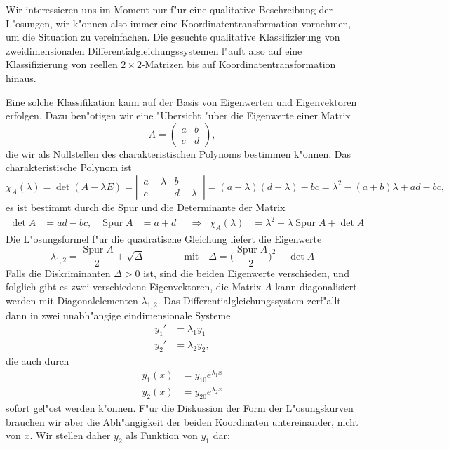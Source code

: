 Wir interessieren uns im Moment nur f"ur eine qualitative Beschreibung
der L"osungen, wir k"onnen also immer eine Koordinatentransformation
vornehmen, um die Situation zu vereinfachen.
Die gesuchte qualitative Klassifizierung von zweidimensionalen
Differentialgleichungssystemen l"auft also auf eine Klassifizierung
von reellen $2\times 2$-Matrizen bis auf Koordinatentransformation
hinaus.

Eine solche Klassifikation kann auf der Basis von Eigenwerten und
Eigenvektoren erfolgen.
Dazu ben"otigen wir eine "Ubersicht "uber die Eigenwerte einer
Matrix
\[
A=\begin{pmatrix}a&b\\c&d\end{pmatrix},
\]
die wir als Nullstellen des charakteristischen Polynoms bestimmen
k"onnen.
Das charakteristische Polynom ist
\[
\chi_A(\lambda)
=
\det(A-\lambda E)
=
\left|\,\begin{matrix}a-\lambda&b\\c&d-\lambda\end{matrix}\,\right|
=
(a-\lambda)(d-\lambda)-bc
=
\lambda^2-(a+b)\lambda + ad-bc,
\]
es ist bestimmt durch die Spur und die Determinante der Matrix
\[
\begin{aligned}
\det A&=ad -bc,
&
\operatorname{Spur}A&=a+d
&
&\Rightarrow
&
\chi_A(\lambda)&=\lambda^2-\lambda \operatorname{Spur}A+\det A
\end{aligned}
\]
Die L"osungsformel f"ur die quadratische Gleichung liefert die
Eigenwerte
\[
\lambda_{1,2}
=
\frac{\operatorname{Spur}A}2\pm\sqrt{\Delta}
\qquad
\qquad
\text{mit}\quad
\Delta = \biggl(\frac{\operatorname{Spur}A}2\biggr)^2 - \det A
\]
Falls die Diskriminanten $\Delta > 0$ ist, sind die beiden Eigenwerte
verschieden, und folglich gibt es zwei verschiedene Eigenvektoren,
die Matrix $A$ kann diagonalisiert werden mit Diagonalelementen
$\lambda_{1,2}$.  Das Differentialgleichungssystem zerf"allt dann
in zwei unabh"angige eindimensionale Systeme
\begin{align*}
y_1'&= \lambda_1 y_1\\
y_2'&= \lambda_2 y_2,
\end{align*}
die auch durch
\begin{align*}
y_1(x)&=y_{10} e^{\lambda_1 x}\\
y_2(x)&=y_{20} e^{\lambda_2 x}
\end{align*}
sofort gel"ost werden k"onnen.
F"ur die Diskussion der Form der L"osungskurven brauchen wir aber die
Abh"angigkeit der beiden Koordinaten untereinander, nicht von $x$.
Wir stellen daher $y_2$ als Funktion von $y_1$ dar:
